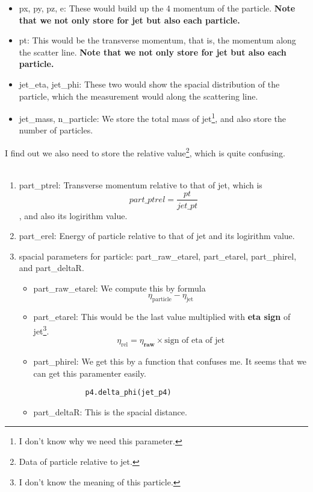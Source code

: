\documentclass[12pt]{article}
\numberwithin{equation}{section}
\begin{document}
\begin{itemize}
    \item px, py, pz, e: These would build up the 4 momentum of the particle. \textbf{Note that we not only store for jet but also each particle. }
    \item pt: This would be the transverse momentum, that is, the momentum along the scatter line. \textbf{Note that we not only store for jet but also each particle.}
    \item jet\_eta, jet\_phi: These two would show the spacial distribution of the particle, which the measurement would along the scattering line.
    \item jet\_mass, n\_particle: We store the total mass of jet\footnote{I don't know why we need this parameter.}, and also store the number of particles.
\end{itemize}

I find out we also need to store the relative value\footnote{Data of particle relative to jet.}, which is quite confusing. 
\\\\
\begin{enumerate}
    \item part\_ptrel: Transverse momentum relative to that of jet, which is $$part\_ptrel = \frac{pt}{jet\_pt}$$, and also its logirithm value.
    \item part\_erel:  Energy of particle relative to that of jet and its logirithm value.
    \item spacial parameters for particle: part\_raw\_etarel, part\_etarel, part\_phirel, and part\_deltaR.
    \begin{itemize}
        \item part\_raw\_etarel: We compute this by formula$$\eta_{\text{particle}} - \eta_{\text{jet}}$$
        \item part\_etarel: This would be the last value multiplied with \textbf{eta sign} of jet\footnote{I don't know the meaning of this particle.}.$$\eta_{\text{rel}} = \eta_{\textbf{raw}}\times\text{sign of eta of jet}$$
        \item part\_phirel: We get this by a function that confuses me. It seems that we can get this paramenter easily.
        \begin{center}
        \begin{lstlisting}
            p4.delta_phi(jet_p4)
        \end{lstlisting}
    \end{center}
        \item part\_deltaR: This is the spacial distance.
    \end{itemize}
\end{enumerate}
\end{document}
